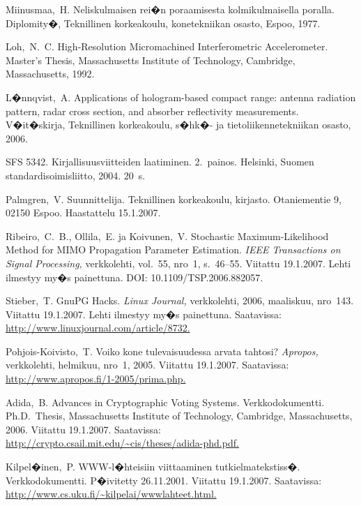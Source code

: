\documentclass[finnish,12pt,a4paper,pdftex]{article}
\begin{document}
\begin{thebibliography}{99}
 Miinusmaa,\ H. Neliskulmaisen rei�n poraamisesta
  kolmikulmaisella poralla. Diplomity�, Teknillinen korkeakoulu,
  konetekniikan osasto, Espoo, 1977.

 Loh,\ N.\ C. High-Resolution Micromachined
  Interferometric Accelerometer. Master's Thesis, Massachusetts
  Institute of Technology, Cambridge,
  \foreignlanguage{english}{Massachusetts,} 1992.

 L�nnqvist,\ A.
  \foreignlanguage{english}{Applications of hologram-based compact
    range: antenna radiation pattern, radar cross section, and
    absorber reflectivity measurements.} V�it�skirja, Teknillinen
  korkeakoulu, s�hk�- ja tietoliikennetekniikan osasto, 2006.

 SFS 5342. Kirjallisuusviitteiden laatiminen. 2.\ painos.
  Helsinki, Suomen standardisoimisliitto, 2004. 20~s.

 Palmgren,\ V. Suunnittelija. Teknillinen
  korkeakoulu, kirjasto. Otaniementie 9, 02150 Espoo. Haastattelu
  15.1.2007.

 Ribeiro,\ C.\ B., Ollila,\ E. ja Koivunen,\ V.
  \foreignlanguage{english}{Stochastic Maximum-Likelihood Method for
    MIMO Propagation Parameter Estimation.} \textit{IEEE Transactions
    on Signal Processing,} verkkolehti, vol.\ 55, nro~1, s.\ 46--55.
  Viitattu 19.1.2007. Lehti ilmestyy my�s painettuna. DOI:
  10.1109/TSP.2006.882057.

 Stieber,\ T. GnuPG Hacks. \textit{Linux Journal,}
  verkkolehti, 2006, maaliskuu, nro~143. Viitattu 19.1.2007. Lehti
  ilmestyy my�s painettuna. Saatavissa:
  \url{http://www.linuxjournal.com/article/8732.}

 Pohjois-Koivisto,\ T. Voiko kone tulevaisuudessa arvata
  tahtosi?  \textit{Apropos,} verkkolehti, helmikuu, nro~1, 2005.
  Viitattu 19.1.2007.  Saatavissa:
  \url{http://www.apropos.fi/1-2005/prima.php.}

 Adida,\ B.  Advances in Cryptographic Voting Systems.
  Verkkodokumentti. Ph.D.\ Thesis, Massachusetts Institute of
  Technology, Cambridge, \foreignlanguage{english}{Massachusetts,}
  2006. Viitattu 19.1.2007.  Saatavissa:
  \url{http://crypto.csail.mit.edu/~cis/theses/adida-phd.pdf.}

 Kilpel�inen,\ P. WWW-l�hteisiin viittaaminen
  tutkielmatekstiss�. Verkkodokumentti. P�ivitetty 26.11.2001.
  Viitattu 19.1.2007. Saatavissa:
  \url{http://www.cs.uku.fi/~kilpelai/wwwlahteet.html.}

\end{thebibliography}
\end{document}
